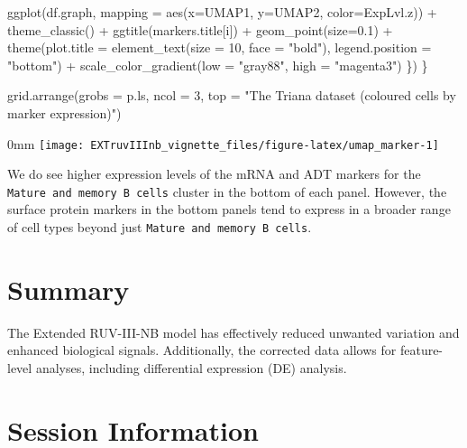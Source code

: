 \documentclass[]{article}
\newcommand{\hlnum}[1]{\textcolor[rgb]{0.816,0.125,0.439}{#1}}%
\newcommand{\hlstr}[1]{\textcolor[rgb]{0.251,0.627,0.251}{#1}}%
\newcommand{\hlstd}[1]{\textcolor[rgb]{0.251,0.251,0.251}{#1}}%
\newenvironment{Shaded}{\begin{myshaded}}{\end{myshaded}}
\newcommand{\DecValTok}[1]{\hlnum{#1}}
\newcommand{\FloatTok}[1]{\hlnum{#1}}
\newcommand{\SpecialCharTok}[1]{\hlstr{#1}}
\newcommand{\StringTok}[1]{\hlstr{#1}}
\newcommand{\FunctionTok}[1]{\hlstd{#1}}
\newcommand{\AttributeTok}[1]{{#1}}
\newcommand{\NormalTok}[1]{\hlstd{#1}}
\begin{document}
\begin{Shaded}
\begin{Highlighting}[]
    \FunctionTok{ggplot}\NormalTok{(df.graph, }\AttributeTok{mapping =} \FunctionTok{aes}\NormalTok{(}\AttributeTok{x=}\NormalTok{UMAP1, }\AttributeTok{y=}\NormalTok{UMAP2, }\AttributeTok{color=}\NormalTok{ExpLvl.z)) }\SpecialCharTok{+}
    \FunctionTok{theme\_classic}\NormalTok{() }\SpecialCharTok{+}
    \FunctionTok{ggtitle}\NormalTok{(markers.title[i]) }\SpecialCharTok{+}
    \FunctionTok{geom\_point}\NormalTok{(}\AttributeTok{size=}\FloatTok{0.1}\NormalTok{) }\SpecialCharTok{+}
    \FunctionTok{theme}\NormalTok{(}\AttributeTok{plot.title =} \FunctionTok{element\_text}\NormalTok{(}\AttributeTok{size =} \DecValTok{10}\NormalTok{, }\AttributeTok{face =} \StringTok{"bold"}\NormalTok{), }\AttributeTok{legend.position =} \StringTok{"bottom"}\NormalTok{) }\SpecialCharTok{+}
    \FunctionTok{scale\_color\_gradient}\NormalTok{(}\AttributeTok{low =} \StringTok{"gray88"}\NormalTok{, }\AttributeTok{high =} \StringTok{"magenta3"}\NormalTok{)}
\NormalTok{  \})    }
\NormalTok{\}}

\FunctionTok{grid.arrange}\NormalTok{(}\AttributeTok{grobs =}\NormalTok{ p.ls, }\AttributeTok{ncol =} \DecValTok{3}\NormalTok{,}
             \AttributeTok{top =} \StringTok{"The Triana dataset (coloured cells by marker expression)"}\NormalTok{)}
\end{Highlighting}
\end{Shaded}

\begin{adjustwidth}{\fltoffset}{0mm}
\texttt{[image: EXTruvIIInb\_vignette\_files/figure-latex/umap\_marker-1]} \end{adjustwidth}

We do see higher expression levels of the mRNA and ADT markers for the \texttt{Mature and memory B cells} cluster in the bottom of each panel. However, the surface protein markers in the bottom panels tend to express in a broader range of cell types beyond just \texttt{Mature and memory B cells}.

\section{Summary}\label{summary}

The Extended RUV-III-NB model has effectively reduced unwanted variation and enhanced biological signals. Additionally, the corrected data allows for feature-level analyses, including differential expression (DE) analysis.

\section{Session Information}\label{session-information}
\end{document}
